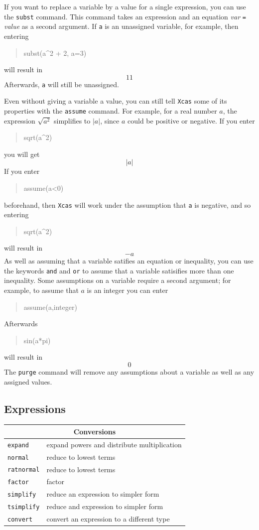 \documentclass{article}
\newcommand{\xcasin}[1]
{\begin{quote}\ttfamily
#1
\end{quote}}
\newcommand{\xcasout}[1]
{\begin{equation*}
#1
\end{equation*}}
\begin{document}
If you want to replace a variable by a value for a single expression,
you can use the \texttt{subst} command.  This command takes an
expression and an equation \textit{var} \texttt{=} \textit{value} as a
second argument.  If \texttt{a} is an unassigned variable, for example, then
entering
\xcasin{subst(a\^{}2 + 2, a=3)}
will result in
\xcasout{11}
Afterwards, \texttt{a} will still be unassigned.

Even without giving a variable a value, you can still tell
\texttt{Xcas} some of its properties with the \texttt{assume} command.
For example, for a real number $a$, the expression $\sqrt{a^2}$
simplifies to $|a|$, since $a$ could be positive or negative.  If you
enter 
\xcasin{sqrt(a\^{}2)}
you will get
\xcasout{|a|}
If you enter 
\xcasin{assume(a<0)}
beforehand, then \texttt{Xcas} will work under the assumption that
\texttt{a} is negative, and so entering
\xcasin{sqrt(a\^{}2)}
will result in
\xcasout{-a}
As well as assuming that a variable satifies an equation or
inequality, you can use the keywords \texttt{and} and \texttt{or} to
assume that a variable satisifies more than one inequality.  Some
assumptions on a variable require a second argument; for example, to
assume that $a$ is an integer you can enter
\xcasin{assume(a,integer)}
Afterwards
\xcasin{sin(a*pi)}
will result in 
\xcasout{0}
The \texttt{purge} command will remove any assumptions about a
variable as well as any assigned values.


\subsection{Expressions}

\begin{center}
\begin{tabular}{|p{}|p{}|}
\hline
\multicolumn{2}{|c|}{\textbf{Conversions}}\\
\hline\hline
\texttt{expand}  &  expand powers and distribute multiplication  \\
\texttt{normal}   & reduce to lowest terms\\
\texttt{ratnormal}   & reduce to lowest terms\\
\texttt{factor}   &  factor\\
\texttt{simplify}   & reduce an expression to simpler form\\
\texttt{tsimplify}   & reduce and expression to simpler form\\
\texttt{convert}   & convert an expression to a different type\\
\hline
\end{tabular}
\end{center}
\end{document}

